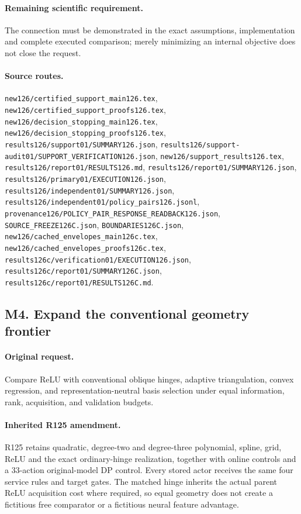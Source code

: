 \paragraph{Remaining scientific requirement.} The connection must be demonstrated in the exact assumptions, implementation and complete executed comparison; merely minimizing an internal objective does not close the request.

\paragraph{Source routes.} \nolinkurl{new126/certified_support_main126.tex}, \nolinkurl{new126/certified_support_proofs126.tex}, \nolinkurl{new126/decision_stopping_main126.tex}, \nolinkurl{new126/decision_stopping_proofs126.tex}, \nolinkurl{results126/support01/SUMMARY126.json}, \nolinkurl{results126/support-audit01/SUPPORT_VERIFICATION126.json}, \nolinkurl{new126/support_results126.tex}, \nolinkurl{results126/report01/RESULTS126.md}, \nolinkurl{results126/report01/SUMMARY126.json}, \nolinkurl{results126/primary01/EXECUTION126.json}, \nolinkurl{results126/independent01/SUMMARY126.json}, \nolinkurl{results126/independent01/policy_pairs126.jsonl}, \nolinkurl{provenance126/POLICY_PAIR_RESPONSE_READBACK126.json}, \nolinkurl{SOURCE_FREEZE126C.json}, \nolinkurl{BOUNDARIES126C.json}, \nolinkurl{new126/cached_envelopes_main126c.tex}, \nolinkurl{new126/cached_envelopes_proofs126c.tex}, \nolinkurl{results126c/verification01/EXECUTION126.json}, \nolinkurl{results126c/report01/SUMMARY126C.json}, \nolinkurl{results126c/report01/RESULTS126C.md}.

\subsection*{M4. Expand the conventional geometry frontier}
\paragraph{Original request.} Compare ReLU with conventional oblique hinges, adaptive triangulation, convex regression, and representation-neutral basis selection under equal information, rank, acquisition, and validation budgets.

\paragraph{Inherited R125 amendment.} R125 retains quadratic, degree-two and degree-three polynomial, spline, grid, ReLU and the exact ordinary-hinge realization, together with online controls and a 33-action original-model DP control. Every stored actor receives the same four service rules and target gates. The matched hinge inherits the actual parent ReLU acquisition cost where required, so equal geometry does not create a fictitious free comparator or a fictitious neural feature advantage.


